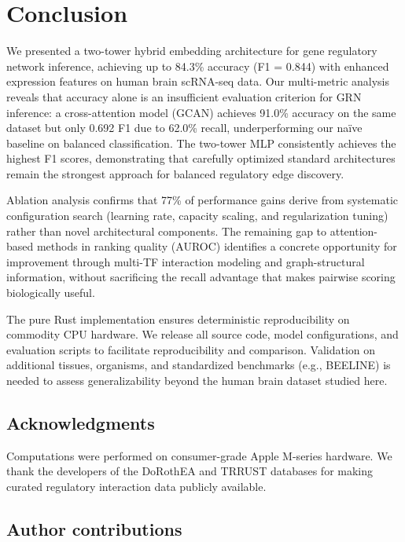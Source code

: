\documentclass[10pt,twocolumn]{article}
\begin{document}
\section{Conclusion}
\label{sec:conclusion}

We presented a two-tower hybrid embedding architecture for gene regulatory network inference, achieving up to 84.3\% accuracy (F1 = 0.844) with enhanced expression features on human brain scRNA-seq data.
Our multi-metric analysis reveals that accuracy alone is an insufficient evaluation criterion for GRN inference: a cross-attention model (GCAN) achieves 91.0\% accuracy on the same dataset but only 0.692 F1 due to 62.0\% recall, underperforming our na\"{i}ve baseline on balanced classification.
The two-tower MLP consistently achieves the highest F1 scores, demonstrating that carefully optimized standard architectures remain the strongest approach for balanced regulatory edge discovery.

Ablation analysis confirms that 77\% of performance gains derive from systematic configuration search (learning rate, capacity scaling, and regularization tuning) rather than novel architectural components.
The remaining gap to attention-based methods in ranking quality (AUROC) identifies a concrete opportunity for improvement through multi-TF interaction modeling and graph-structural information, without sacrificing the recall advantage that makes pairwise scoring biologically useful.

The pure Rust implementation ensures deterministic reproducibility on commodity CPU hardware.
We release all source code, model configurations, and evaluation scripts to facilitate reproducibility and comparison.
Validation on additional tissues, organisms, and standardized benchmarks (e.g., BEELINE) is needed to assess generalizability beyond the human brain dataset studied here.

\subsection*{Acknowledgments}

Computations were performed on consumer-grade Apple M-series hardware.
We thank the developers of the DoRothEA and TRRUST databases for making curated regulatory interaction data publicly available.

\subsection*{Author contributions}
\end{document}
